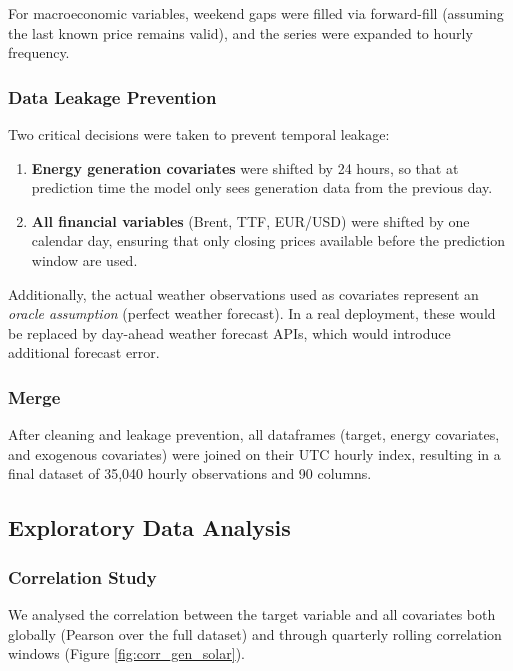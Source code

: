 \documentclass[11pt,a4paper]{article}
\begin{document}
For macroeconomic variables, weekend gaps were filled via forward-fill (assuming the last known price remains valid), and the series were expanded to hourly frequency.

\subsubsection{Data Leakage Prevention}

Two critical decisions were taken to prevent temporal leakage:

\begin{enumerate}[nosep]
    \item \textbf{Energy generation covariates} were shifted by 24 hours, so that at prediction time the model only sees generation data from the previous day.
    \item \textbf{All financial variables} (Brent, TTF, EUR/USD) were shifted by one calendar day, ensuring that only closing prices available before the prediction window are used.
\end{enumerate}

Additionally, the actual weather observations used as covariates represent an \textit{oracle assumption} (perfect weather forecast). In a real deployment, these would be replaced by day-ahead weather forecast APIs, which would introduce additional forecast error.

\subsubsection{Merge}

After cleaning and leakage prevention, all dataframes (target, energy covariates, and exogenous covariates) were joined on their UTC hourly index, resulting in a final dataset of 35,040 hourly observations and 90 columns.

\subsection{Exploratory Data Analysis}

\subsubsection{Correlation Study}

We analysed the correlation between the target variable and all covariates both globally (Pearson over the full dataset) and through quarterly rolling correlation windows (Figure \ref{fig:corr_gen_solar}).
\end{document}
